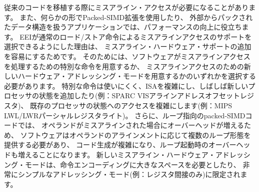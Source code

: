 \begin{commentary}
\begin{comment}
Misaligned accesses are occasionally required when porting legacy
code, and help performance on applications when using any form of
packed-SIMD extension or handling externally packed data structures.
Our rationale for allowing EEIs to choose to support misaligned
accesses via the regular load and store instructions is to simplify
the addition of misaligned hardware support.  One option would have
been to disallow misaligned accesses in the base ISA and then provide
some separate ISA support for misaligned accesses, either special
instructions to help software handle misaligned accesses or a new
hardware addressing mode for misaligned accesses.  Special
instructions are difficult to use, complicate the ISA, and often add
new processor state (e.g., SPARC VIS align address offset register) or
complicate access to existing processor state (e.g., MIPS LWL/LWR
partial register writes).  In addition, for loop-oriented packed-SIMD
code, the extra overhead when operands are misaligned motivates
software to provide multiple forms of loop depending on operand
alignment, which complicates code generation and adds to loop startup
overhead.  New misaligned hardware addressing modes take considerable
space in the instruction encoding or require very simplified
addressing modes (e.g., register indirect only).
\end{comment}

従来のコードを移植する際にミスアライン・アクセスが必要になることがあります。
また、何らかの形でPacked-SIMD拡張を使用したり、
外部からパックされたデータ構造を扱うアプリケーションでは、パフォーマンスの向上に役立ちます。
EEIが通常のロード/ストア命令によるミスアラインアクセスのサポートを選択できるようにした理由は、
ミスアライン・ハードウェア・サポートの追加を容易にするためです。 
そのためには、ソフトウェアがミスアラインアクセスを処理するための特別な命令を用意するか、
ミスアラインアクセスのための新しいハードウェア・アドレッシング・モードを用意するかのいずれかを選択する必要があります。 
特別な命令は使いにくく、ISAを複雑にし、しばしば新しいプロセッサの状態を追加したり(例：SPARC VISアラインアドレスオフセットレジスタ)、
既存のプロセッサの状態へのアクセスを複雑にします(例：MIPS LWL/LWRパーシャルレジスタライト)。
さらに、ループ指向のpacked-SIMDコードでは、
オペランドがミスアラインされた場合にオーバーヘッドが増えるため、
ソフトウェアはオペランドのアラインメントに応じて複数のループ形態を提供する必要があり、
コード生成が複雑になり、ループ起動時のオーバーヘッドも増えることになります。
新しいミスアライン・ハードウェア・アドレッシング・モードは、命令エンコーディングに大きなスペースを必要としたり、
非常にシンプルなアドレッシング・モード(例：レジスタ間接のみ)に限定されます。
\end{commentary}

